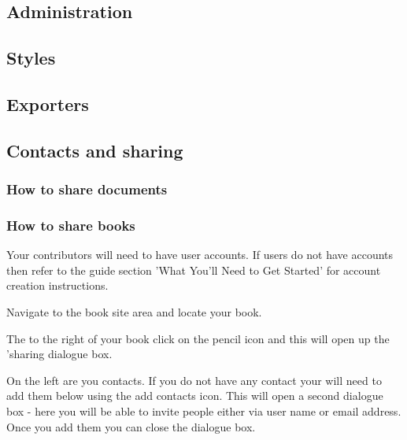\documentclass{article}
\begin{document}
\subsection{Administration}\label{H4807452}






\subsection{Styles}\label{H5511626}






\subsection{Exporters}\label{H6892689}






\subsection{Contacts and sharing}\label{H8001298}



\subsubsection{How to share documents}\label{H3072165}






\subsubsection{How to share books}\label{H3372306}



Your contributors will need to have user accounts. If users do not have accounts then refer to the guide section 'What You'll Need to Get Started' for account creation instructions.


Navigate to the book site area and locate your book.


The to the right of your book click on the pencil icon and this will open up the 'sharing dialogue box.


On the left are you contacts. If you do not have any contact your will need to add them below using the add contacts icon. This will open a second dialogue box - here you will be able to invite people either via user name or email address. Once you add them you can close the dialogue box.
\end{document}
